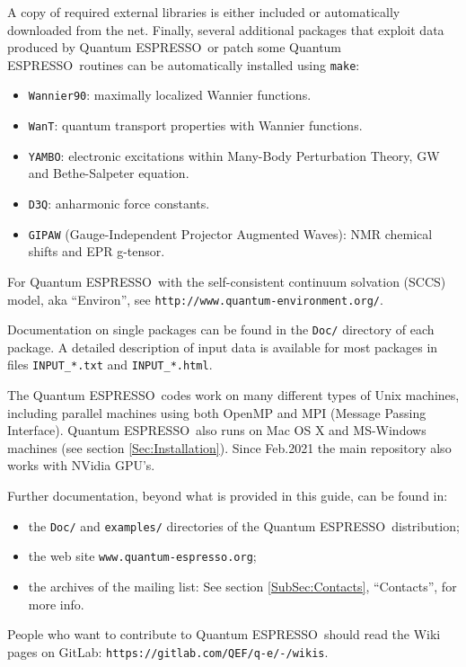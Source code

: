 \documentclass[12pt,a4paper]{article}
\def\qe{{\sc Quantum ESPRESSO}}
\def\make{\texttt{make}}
\begin{document}
A copy of required external libraries is either included or automatically
downloaded from the net.
Finally, several additional packages that exploit data produced by \qe\
or patch some \qe\ routines can be automatically installed using
\make:
\begin{itemize}
\item \texttt{Wannier90}:
      maximally localized Wannier functions.
\item \texttt{WanT}:
      quantum transport properties with Wannier functions.
\item \texttt{YAMBO}:
      electronic excitations within Many-Body Perturbation Theory,
      GW and Bethe-Salpeter equation.
\item \texttt{D3Q}:
      anharmonic force constants.
\item \texttt{GIPAW} (Gauge-Independent Projector Augmented Waves):
      NMR chemical shifts and EPR g-tensor.
\end{itemize}
For \qe\ with the self-consistent continuum solvation (SCCS) model,
aka ``Environ'', see \texttt{http://www.quantum-environment.org/}.

Documentation on single packages can be found in the \texttt{Doc/}
directory of each package. A detailed description of input
data is available for most packages in files \texttt{INPUT\_*.txt} and
\texttt{INPUT\_*.html}.

The \qe\ codes work on many different types of Unix machines,
including parallel machines using both OpenMP and MPI
(Message Passing Interface).
\qe\ also runs on Mac OS X and MS-Windows machines
(see section \ref{Sec:Installation}). Since Feb.2021 the main
repository also works with NVidia GPU's.

Further documentation, beyond what is provided in this guide, can be found in:
\begin{itemize}
\item the \texttt{Doc/} and \texttt{examples/} directories
  of the \qe\ distribution;
  \item the web site \texttt{www.quantum-espresso.org};
  \item the archives of the  mailing list:
   See section \ref{SubSec:Contacts}, ``Contacts'', for more info.
\end{itemize}
People who want to contribute to \qe\ should read the
Wiki pages on GitLab: \texttt{https://gitlab.com/QEF/q-e/-/wikis}.
\end{document}
